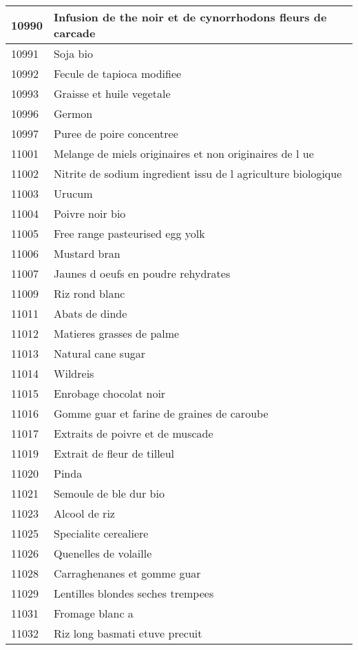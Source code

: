 \begin{longtable}{|l|l|}
10990 & Infusion de the noir et de cynorrhodons fleurs de carcade \\ \hline 
10991 & Soja bio \\ \hline 
10992 & Fecule de tapioca modifiee \\ \hline 
10993 & Graisse et huile vegetale \\ \hline 
10996 & Germon \\ \hline 
10997 & Puree de poire concentree \\ \hline 
11001 & Melange de miels originaires et non originaires de l ue \\ \hline 
11002 & Nitrite de sodium  ingredient issu de l agriculture biologique \\ \hline 
11003 & Urucum \\ \hline 
11004 & Poivre noir bio \\ \hline 
11005 & Free range pasteurised egg yolk \\ \hline 
11006 & Mustard bran \\ \hline 
11007 & Jaunes d oeufs en poudre rehydrates \\ \hline 
11009 & Riz rond blanc \\ \hline 
11011 & Abats de dinde \\ \hline 
11012 & Matieres grasses de palme \\ \hline 
11013 & Natural cane sugar \\ \hline 
11014 & Wildreis \\ \hline 
11015 & Enrobage chocolat noir \\ \hline 
11016 & Gomme guar et farine de graines de caroube \\ \hline 
11017 & Extraits de poivre et de muscade \\ \hline 
11019 & Extrait de fleur de tilleul \\ \hline 
11020 & Pinda \\ \hline 
11021 & Semoule de ble dur bio \\ \hline 
11023 & Alcool de riz \\ \hline 
11025 & Specialite cerealiere \\ \hline 
11026 & Quenelles de volaille \\ \hline 
11028 & Carraghenanes et gomme guar \\ \hline 
11029 & Lentilles blondes seches trempees \\ \hline 
11031 & Fromage blanc a \\ \hline 
11032 & Riz long basmati etuve precuit \\ \hline 

\end{longtable}
